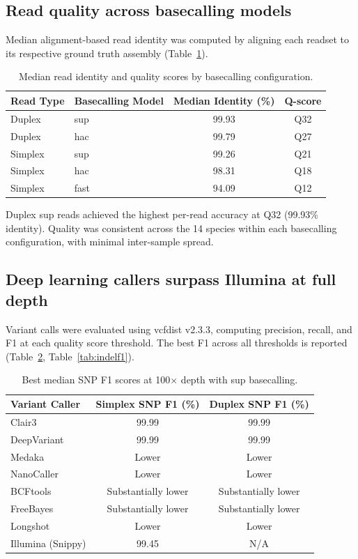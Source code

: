 \documentclass[11pt]{article}
\begin{document}
\subsection{Read quality across basecalling models}

Median alignment-based read identity was computed by aligning each readset to its respective ground truth assembly (Table~\ref{tab:readquality}).

\begin{table}[ht]
\centering
\caption{Median read identity and quality scores by basecalling configuration.}
\label{tab:readquality}
\begin{tabular}{llcc}
\toprule
Read Type & Basecalling Model & Median Identity (\%) & Q-score \\
\midrule
Duplex & sup & 99.93 & Q32 \\
Duplex & hac & 99.79 & Q27 \\
Simplex & sup & 99.26 & Q21 \\
Simplex & hac & 98.31 & Q18 \\
Simplex & fast & 94.09 & Q12 \\
\bottomrule
\end{tabular}
\end{table}

Duplex sup reads achieved the highest per-read accuracy at Q32 (99.93\% identity). Quality was consistent across the 14 species within each basecalling configuration, with minimal inter-sample spread.

\subsection{Deep learning callers surpass Illumina at full depth}

Variant calls were evaluated using vcfdist v2.3.3, computing precision, recall, and F1 at each quality score threshold. The best F1 across all thresholds is reported (Table~\ref{tab:snpf1}, Table~\ref{tab:indelf1}).

\begin{table}[ht]
\centering
\caption{Best median SNP F1 scores at 100$\times$ depth with sup basecalling.}
\label{tab:snpf1}
\begin{tabular}{lcc}
\toprule
Variant Caller & Simplex SNP F1 (\%) & Duplex SNP F1 (\%) \\
\midrule
Clair3 & 99.99 & 99.99 \\
DeepVariant & 99.99 & 99.99 \\
Medaka & Lower & Lower \\
NanoCaller & Lower & Lower \\
BCFtools & Substantially lower & Substantially lower \\
FreeBayes & Substantially lower & Substantially lower \\
Longshot & Lower & Lower \\
Illumina (Snippy) & 99.45 & N/A \\
\bottomrule
\end{tabular}
\end{table}
\end{document}
